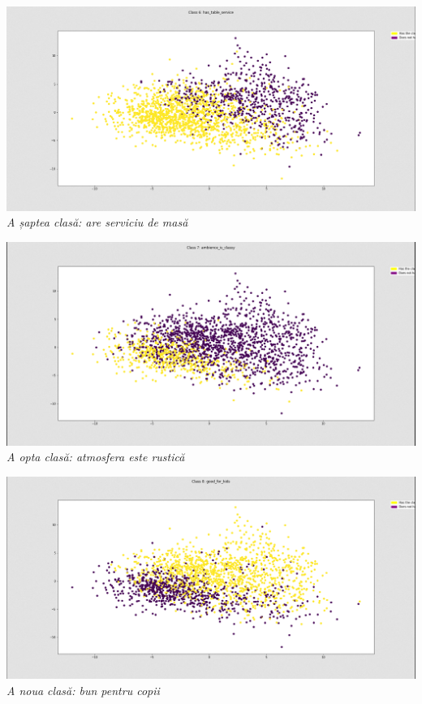 \begin{center}
\includegraphics[scale=0.4]{class6} \\
\textit{A șaptea clasă: are serviciu de masă} \\
\hfill \break

\includegraphics[scale=0.4]{class7} \\
\textit{A opta clasă: atmosfera este rustică} \\
\hfill \break

\includegraphics[scale=0.4]{class8} \\
\textit{A noua clasă: bun pentru copii} \\
\end{center}

